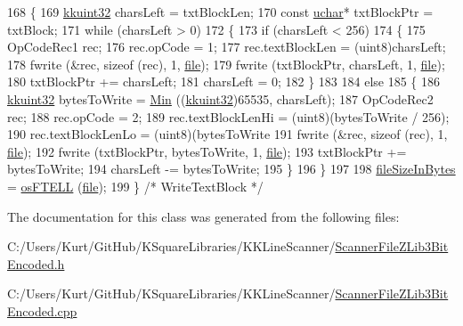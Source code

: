 \begin{DoxyCode}
168 \{
169   \hyperlink{namespace_k_k_b_af8d832f05c54994a1cce25bd5743e19a}{kkuint32}  charsLeft = txtBlockLen;
170   \textcolor{keyword}{const} \hyperlink{namespace_k_k_b_ace9969169bf514f9ee6185186949cdf7}{uchar}*  txtBlockPtr = txtBlock;
171   \textcolor{keywordflow}{while}  (charsLeft > 0)
172   \{
173     \textcolor{keywordflow}{if}  (charsLeft < 256)
174     \{
175       OpCodeRec1  rec;
176       rec.opCode = 1;
177       rec.textBlockLen = (uint8)charsLeft;
178       fwrite (&rec, \textcolor{keyword}{sizeof} (rec), 1, \hyperlink{class_k_k_l_s_c_1_1_scanner_file_a26db15f7823ce67b1621da17468ec807}{file});
179       fwrite (txtBlockPtr, charsLeft, 1, \hyperlink{class_k_k_l_s_c_1_1_scanner_file_a26db15f7823ce67b1621da17468ec807}{file});
180       txtBlockPtr += charsLeft;
181       charsLeft = 0;
182     \}
183 
184     \textcolor{keywordflow}{else}
185     \{
186       \hyperlink{namespace_k_k_b_af8d832f05c54994a1cce25bd5743e19a}{kkuint32}  bytesToWrite = \hyperlink{_raster_8cpp_a6261a282d8ed27242c636ad5fb658585}{Min} ((\hyperlink{namespace_k_k_b_af8d832f05c54994a1cce25bd5743e19a}{kkuint32})65535, charsLeft);
187       OpCodeRec2  rec;
188       rec.opCode = 2;
189       rec.textBlockLenHi = (uint8)(bytesToWrite / 256);
190       rec.textBlockLenLo = (uint8)(bytesToWrite %
191       fwrite (&rec, \textcolor{keyword}{sizeof} (rec), 1, \hyperlink{class_k_k_l_s_c_1_1_scanner_file_a26db15f7823ce67b1621da17468ec807}{file});
192       fwrite (txtBlockPtr, bytesToWrite, 1, \hyperlink{class_k_k_l_s_c_1_1_scanner_file_a26db15f7823ce67b1621da17468ec807}{file});
193       txtBlockPtr += bytesToWrite;
194       charsLeft -= bytesToWrite;
195     \}
196   \}
197 
198   \hyperlink{class_k_k_l_s_c_1_1_scanner_file_aa630f7e950cfd1cd6ecaa901f410728a}{fileSizeInBytes} = \hyperlink{namespace_k_k_b_a2cc11a5ae09d10d69ad751b549e5d94e}{osFTELL} (\hyperlink{class_k_k_l_s_c_1_1_scanner_file_a26db15f7823ce67b1621da17468ec807}{file});
199 \}  \textcolor{comment}{/* WriteTextBlock */}
\end{DoxyCode}


The documentation for this class was generated from the following files\+:\begin{DoxyCompactItemize}
\item 
C\+:/\+Users/\+Kurt/\+Git\+Hub/\+K\+Square\+Libraries/\+K\+K\+Line\+Scanner/\hyperlink{_scanner_file_z_lib3_bit_encoded_8h}{Scanner\+File\+Z\+Lib3\+Bit\+Encoded.\+h}\item 
C\+:/\+Users/\+Kurt/\+Git\+Hub/\+K\+Square\+Libraries/\+K\+K\+Line\+Scanner/\hyperlink{_scanner_file_z_lib3_bit_encoded_8cpp}{Scanner\+File\+Z\+Lib3\+Bit\+Encoded.\+cpp}\end{DoxyCompactItemize}
